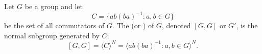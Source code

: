 Let $G$ be a group and let
$$
C = \{ab(ba)^{-1} : a, b \in G\}
$$
be the set of all commutators of $G$. The  (or ) of $G$, denoted $[G, G]$ or $G'$, is the normal subgroup generated by $C$:
$$
[G, G] = \langle C \rangle^{N} = \langle ab(ba)^{-1} : a, b \in G \rangle^{N}.
$$
